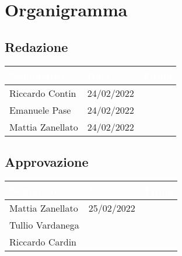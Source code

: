 \chapter{Organigramma}
\renewcommand\arraystretch{2,3}

\section{Redazione}

\begin{center}
  \centering
  \begin{longtable}{|C{3,5cm}|C{2.2cm}|C{6,5cm}|}
    \hline
    \textcolor[HTML]{FFFFFF}{\textbf{Nominativo}} & \textcolor[HTML]{FFFFFF}{\textbf{Data}} & \textcolor[HTML]{FFFFFF}{\textbf{Firma}} \\ \hline
    Riccardo Contin & 24/02/2022 &  \\ \hline
    Emanuele Pase & 24/02/2022 &  \\ \hline
    Mattia Zanellato & 24/02/2022 &  \\ \hline
  \end{longtable}
\end{center}

\section{Approvazione}

\begin{center}
  \centering
  \begin{longtable}{|C{3,5cm}|C{2.2cm}|C{6,5cm}|}
    \hline
    \textcolor[HTML]{FFFFFF}{\textbf{Nominativo}} & \textcolor[HTML]{FFFFFF}{\textbf{Data}} & \textcolor[HTML]{FFFFFF}{\textbf{Firma}} \\ \hline
    Mattia Zanellato & 25/02/2022 &  \\ \hline
    Tullio Vardanega &  &  \\ \hline
    Riccardo Cardin &  &  \\ \hline
  \end{longtable}
\end{center}

